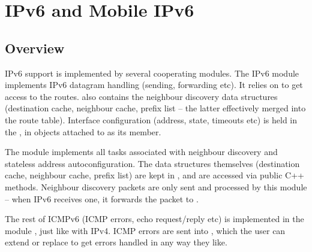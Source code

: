 \chapter{IPv6 and Mobile IPv6}
\label{cha:ipv6}


\section{Overview}
\label{sec:ipv6:overview}

IPv6 support is implemented by several cooperating modules. The IPv6 module
implements IPv6 datagram handling (sending, forwarding etc). It relies on
 to get access to the routes.  also contains the
neighbour discovery data structures (destination cache, neighbour cache,
prefix list -- the latter effectively merged into the route table). Interface
configuration (address, state, timeouts etc) is held in the ,
in  objects attached to 
as its  member.

The module  implements all tasks associated with
neighbour discovery and stateless address autoconfiguration. The data
structures themselves (destination cache, neighbour cache, prefix list)
are kept in , and are accessed via public C++ methods.
Neighbour discovery packets are only sent and processed by this module --
when IPv6 receives one, it forwards the packet to .

The rest of ICMPv6 (ICMP errors, echo request/reply etc) is implemented in
the module , just like with IPv4. ICMP errors are sent into
, which the user can extend or replace to get errors
handled in any way they like.



